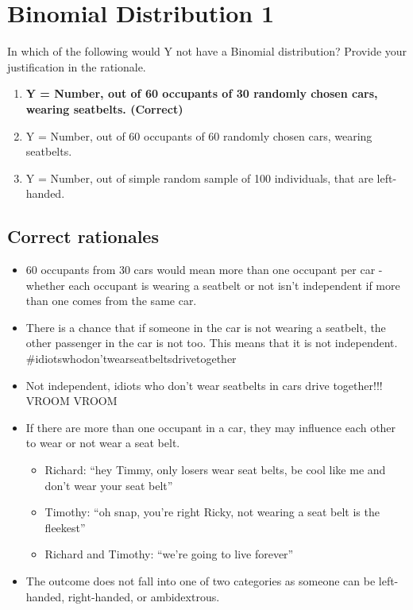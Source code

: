 \documentclass[letterpaper,9pt,twoside,printwatermark=false]{pinp}
\providecommand{\tightlist}{%
  \setlength{\itemsep}{0pt}\setlength{\parskip}{0pt}}
\begin{document}
\hypertarget{binomial-distribution-1}{%
\section{Binomial Distribution 1}\label{binomial-distribution-1}}

In which of the following would Y not have a Binomial distribution?
Provide your justification in the rationale.

\begin{enumerate}
\def\labelenumi{\alph{enumi}.}
\tightlist
\item
  \textbf{Y = Number, out of 60 occupants of 30 randomly chosen cars,
  wearing seatbelts. (Correct)}
\item
  Y = Number, out of 60 occupants of 60 randomly chosen cars, wearing
  seatbelts.
\item
  Y = Number, out of simple random sample of 100 individuals, that are
  left-handed.
\end{enumerate}

\hypertarget{correct-rationales-7}{%
\subsection{Correct rationales}\label{correct-rationales-7}}

\begin{itemize}
\tightlist
\item
  60 occupants from 30 cars would mean more than one occupant per car -
  whether each occupant is wearing a seatbelt or not isn't independent
  if more than one comes from the same car.
\item
  There is a chance that if someone in the car is not wearing a
  seatbelt, the other passenger in the car is not too. This means that
  it is not independent. \#idiotswhodon'twearseatbeltsdrivetogether
\item
  Not independent, idiots who don't wear seatbelts in cars drive
  together!!! VROOM VROOM
\item
  If there are more than one occupant in a car, they may influence each
  other to wear or not wear a seat belt.

  \begin{itemize}
  \tightlist
  \item
    Richard: ``hey Timmy, only losers wear seat belts, be cool like me
    and don't wear your seat belt''
  \item
    Timothy: ``oh snap, you're right Ricky, not wearing a seat belt is
    the fleekest''
  \item
    Richard and Timothy: ``we're going to live forever''
  \end{itemize}
\item
  The outcome does not fall into one of two categories as someone can be
  left-handed, right-handed, or ambidextrous.
\end{itemize}
\end{document}
